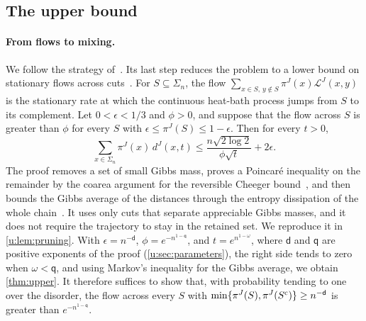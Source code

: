 \subsection{The upper bound}

\paragraph{From flows to mixing.}
We follow the strategy of~\cite{oai-typical-upper}. Its last step reduces the
problem to a lower bound on stationary flows across
cuts~\cite[Section~7, Lemma~8]{oai-typical-upper}. For $S\subseteq\Sigma_n$,
the flow $\sum_{x\in S,\,y\notin S}\pi^J(x)\mathcal L^J(x,y)$ is the stationary
rate at which the continuous heat-bath process jumps from $S$ to its
complement. Let $0<\epsilon<1/3$ and $\phi>0$, and suppose that the flow
across $S$ is greater than $\phi$ for every $S$ with
$\epsilon\le\pi^J(S)\le1-\epsilon$. Then for every $t>0$,
\[
 \sum_{x\in\Sigma_n}\pi^J(x)\,d^J(x,t)\le\frac{n\sqrt{2\log2}}{\phi\sqrt t}+2\epsilon.
\]
The proof removes a set of small Gibbs mass, proves a Poincar\'e inequality
on the remainder by the coarea argument for the reversible Cheeger
bound~\cite[Theorem~3.5]{lawler-sokal-1988}, and then bounds the Gibbs
average of the distances through the entropy dissipation of the whole
chain~\cite[Lemmas~2.5 and~2.7]{diaconis-saloff-coste-1996}. It uses only
cuts that separate appreciable Gibbs masses, and it does not require the
trajectory to stay in the retained set. We reproduce it in
\cref{u:lem:pruning}. With $\epsilon=n^{-\mathsf d}$,
$\phi=e^{-n^{1-\mathsf q}}$, and $t=e^{n^{1-\omega}}$, where $\mathsf d$ and
$\mathsf q$ are positive exponents of the proof (\cref{u:sec:parameters}),
the right side tends to zero when $\omega<\mathsf q$, and using Markov's
inequality for the Gibbs average, we obtain \cref{thm:upper}. It therefore suffices to show
that, with probability tending to one over the disorder, the flow across
every $S$ with $\min\{\pi^J(S),\pi^J(S^{\rm c})\}\ge n^{-\mathsf d}$ is greater
than $e^{-n^{1-\mathsf q}}$.

